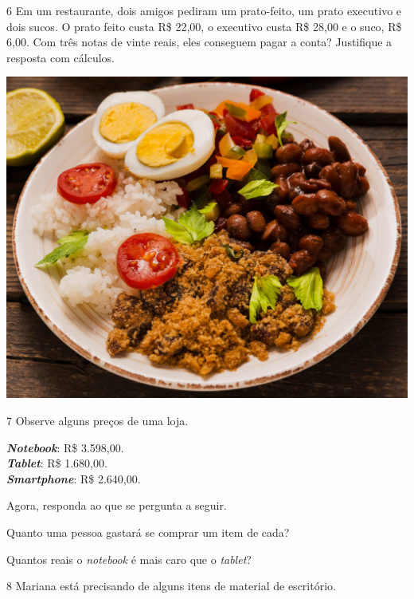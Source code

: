 \num{6} Em um restaurante, dois amigos pediram um prato-feito, um prato executivo
e dois sucos. O prato feito custa R\$ 22,00, o executivo custa R\$
28,00 e o suco, R\$ 6,00. Com três notas de vinte reais, eles
conseguem pagar a conta? Justifique a resposta com cálculos.

\begin{center}
\includegraphics[width=.5\textwidth]{media/image37c.jpg}
\end{center}


\num{7} Observe alguns preços de uma loja.

\begin{myquote}
\textbf{\textit{Notebook}}: R\$ 3.598,00.\\
\textbf{\textit{Tablet}}: R\$ 1.680,00.\\
\textbf{\textit{Smartphone}}: R\$ 2.640,00.
\end{myquote}

Agora, responda ao que se pergunta a seguir.

\begin{escolha}
\item
  Quanto uma pessoa gastará se comprar um item de cada?\\

\item
  Quantos reais o \textit{notebook} é mais caro que o \textit{tablet}?\\
\end{escolha}

\pagebreak

\num{8} Mariana está precisando de alguns itens de material de escritório.

